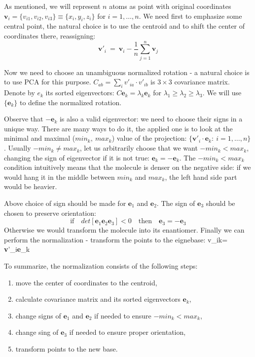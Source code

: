 \documentclass[10pt,journal]{IEEEtranTCOM}
\theoremstyle{plain}
\begin{document}
As mentioned, we will represent $n$ atoms as point with original coordinates $\textbf{v}_i=\{v_{i1},v_{i2},v_{i3}\}\equiv \{x_i,y_i,z_i\}$ for $i=1,\ldots,n$. We need first to emphasize some central point, the natural choice is to use the centroid and to shift the center of coordinates there, reassigning:
$$\textbf{v}'_i\ =\  \textbf{v}_i-\frac{1}{n} \sum_{j=1}^n \textbf{v}_j $$

Now we need to choose an unambiguous normalized rotation - a natural choice is to use PCA for this purpose. $C_{ab}=\sum_i v'_{ia}\cdot v'_{ib}$ is $3\times 3$ covariance matrix. Denote by $e_k$ its sorted eigenvectors: $C \textbf{e}_k = \lambda_k \textbf{e}_k$ for $\lambda_1\geq \lambda_2\geq \lambda_3$. We will use $\{\textbf{e}_k\}$ to define the normalized rotation.

Observe that $-\textbf{e}_k$ is also a valid eigenvector: we need to choose their signs in a unique way. There are many ways to do it, the applied one is to look at the minimal and maximal ($min_k,\ max_k$) value of the projection: $\{\textbf{v}'_i\cdot \textbf{e}_k:\ i=1,\ldots,n\}$. Usually $-min_k\neq max_k$, let us arbitrarily choose that we want $-min_k < max_k$, changing the sign of eigenvector if it is not true: $\textbf{e}_k = -\textbf{e}_k$. The $-min_k < max_k$ condition intuitively means that the molecule is denser on the negative side: if we would hang it in the middle between $min_k$ and $max_k$, the left hand side part would be heavier.

Above choice of sign should be made for $\textbf{e}_1$ and $\textbf{e}_2$. The sign of $\textbf{e}_3$ should be chosen to preserve orientation:
$$ \textrm{if}\quad det[\textbf{e}_1 \textbf{e}_2 \textbf{e}_3]<0\quad \textrm{then}\quad \textbf{e}_3=-\textbf{e}_3$$
Otherwise we would transform the molecule into its enantiomer. Finally we can perform the normalization - transform the points to the eignebase:
\be v_{ik}= \textbf{v}'_i\cdot \textbf{e}_k\ee

To summarize, the normalization consists of the following steps:
\begin{enumerate}
  \item move the center of coordinates to the centroid,
  \item calculate covariance matrix and its sorted eigenvectors $\textbf{e}_k$,
  \item change signs of $\textbf{e}_1$ and $\textbf{e}_2$ if needed to ensure $-min_k < max_k$,
  \item change sing of $\textbf{e}_3$ if needed to ensure proper orientation,
  \item transform points to the new base.
\end{enumerate}
\end{document}
